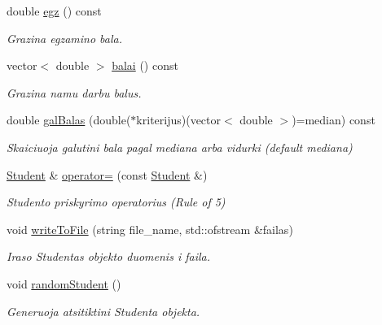 \begin{DoxyCompactItemize}
\mbox{\label{class_student_a1faa264ba61eeec2f405ae59bbaf73b5}} 
double \mbox{\hyperlink{class_student_a1faa264ba61eeec2f405ae59bbaf73b5}{egz}} () const
\begin{DoxyCompactList}\small\item\em Grazina egzamino bala. \end{DoxyCompactList}\item 
\mbox{\label{class_student_afe3edfa7fdf17153c6e081d06b5e8fbd}} 
vector$<$ double $>$ \mbox{\hyperlink{class_student_afe3edfa7fdf17153c6e081d06b5e8fbd}{balai}} () const
\begin{DoxyCompactList}\small\item\em Grazina namu darbu balus. \end{DoxyCompactList}\item 
\mbox{\label{class_student_aacdddbf3343515e337b171ada691c2ba}} 
double \mbox{\hyperlink{class_student_aacdddbf3343515e337b171ada691c2ba}{gal\+Balas}} (double($\ast$kriterijus)(vector$<$ double $>$)=median) const
\begin{DoxyCompactList}\small\item\em Skaiciuoja galutini bala pagal mediana arba vidurki (default mediana) \end{DoxyCompactList}\item 
\mbox{\label{class_student_aa6060eb7193de5bf6a4ae8e4a52bed45}} 
\mbox{\hyperlink{class_student}{Student}} \& \mbox{\hyperlink{class_student_aa6060eb7193de5bf6a4ae8e4a52bed45}{operator=}} (const \mbox{\hyperlink{class_student}{Student}} \&)
\begin{DoxyCompactList}\small\item\em Studento priskyrimo operatorius (Rule of 5) \end{DoxyCompactList}\item 
\mbox{\label{class_student_a42d03d2dbf1b256adaa96b80d308a75f}} 
void \mbox{\hyperlink{class_student_a42d03d2dbf1b256adaa96b80d308a75f}{write\+To\+File}} (string file\+\_\+name, std\+::ofstream \&failas)
\begin{DoxyCompactList}\small\item\em Iraso Studentas objekto duomenis i faila. \end{DoxyCompactList}\item 
\mbox{\label{class_student_a922459970b7cb86504bccfb22fec1ea7}} 
void \mbox{\hyperlink{class_student_a922459970b7cb86504bccfb22fec1ea7}{random\+Student}} ()
\begin{DoxyCompactList}\small\item\em Generuoja atsitiktini Studenta objekta. \end{DoxyCompactList}\end{DoxyCompactItemize}
